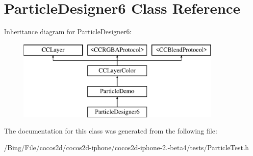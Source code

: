 \hypertarget{interface_particle_designer6}{\section{Particle\-Designer6 Class Reference}
\label{interface_particle_designer6}
}
Inheritance diagram for Particle\-Designer6\-:\begin{figure}[H]
\begin{center}
\leavevmode
\includegraphics[height=4.000000cm]{interface_particle_designer6}
\end{center}
\end{figure}


The documentation for this class was generated from the following file\-:\begin{DoxyCompactItemize}
\item 
/\-Bing/\-File/cocos2d/cocos2d-\/iphone/cocos2d-\/iphone-\/2.-\/beta4/tests/Particle\-Test.\-h\end{DoxyCompactItemize}
